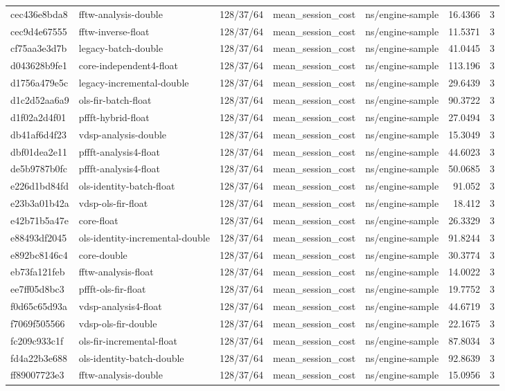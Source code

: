\begin{longtable}{lllllrr}
cec436e8bda8 & fftw-analysis-double & 128/37/64 & mean\_session\_cost & ns/engine-sample & 16.4366 & 3 \\
cec9d4e67555 & fftw-inverse-float & 128/37/64 & mean\_session\_cost & ns/engine-sample & 11.5371 & 3 \\
cf75aa3e3d7b & legacy-batch-double & 128/37/64 & mean\_session\_cost & ns/engine-sample & 41.0445 & 3 \\
d043628b9fe1 & core-independent4-float & 128/37/64 & mean\_session\_cost & ns/engine-sample & 113.196 & 3 \\
d1756a479e5c & legacy-incremental-double & 128/37/64 & mean\_session\_cost & ns/engine-sample & 29.6439 & 3 \\
d1c2d52aa6a9 & ols-fir-batch-float & 128/37/64 & mean\_session\_cost & ns/engine-sample & 90.3722 & 3 \\
d1f02a2d4f01 & pffft-hybrid-float & 128/37/64 & mean\_session\_cost & ns/engine-sample & 27.0494 & 3 \\
db41af6d4f23 & vdsp-analysis-double & 128/37/64 & mean\_session\_cost & ns/engine-sample & 15.3049 & 3 \\
dbf01dea2e11 & pffft-analysis4-float & 128/37/64 & mean\_session\_cost & ns/engine-sample & 44.6023 & 3 \\
de5b9787b0fc & pffft-analysis4-float & 128/37/64 & mean\_session\_cost & ns/engine-sample & 50.0685 & 3 \\
e226d1bd84fd & ols-identity-batch-float & 128/37/64 & mean\_session\_cost & ns/engine-sample & 91.052 & 3 \\
e23b3a01b42a & vdsp-ols-fir-float & 128/37/64 & mean\_session\_cost & ns/engine-sample & 18.412 & 3 \\
e42b71b5a47e & core-float & 128/37/64 & mean\_session\_cost & ns/engine-sample & 26.3329 & 3 \\
e88493df2045 & ols-identity-incremental-double & 128/37/64 & mean\_session\_cost & ns/engine-sample & 91.8244 & 3 \\
e892bc8146c4 & core-double & 128/37/64 & mean\_session\_cost & ns/engine-sample & 30.3774 & 3 \\
eb73fa121feb & fftw-analysis-float & 128/37/64 & mean\_session\_cost & ns/engine-sample & 14.0022 & 3 \\
ee7ff05d8bc3 & pffft-ols-fir-float & 128/37/64 & mean\_session\_cost & ns/engine-sample & 19.7752 & 3 \\
f0d65c65d93a & vdsp-analysis4-float & 128/37/64 & mean\_session\_cost & ns/engine-sample & 44.6719 & 3 \\
f7069f505566 & vdsp-ols-fir-double & 128/37/64 & mean\_session\_cost & ns/engine-sample & 22.1675 & 3 \\
fc209c933c1f & ols-fir-incremental-float & 128/37/64 & mean\_session\_cost & ns/engine-sample & 87.8034 & 3 \\
fd4a22b3e688 & ols-identity-batch-double & 128/37/64 & mean\_session\_cost & ns/engine-sample & 92.8639 & 3 \\
ff89007723e3 & fftw-analysis-double & 128/37/64 & mean\_session\_cost & ns/engine-sample & 15.0956 & 3 \\
\end{longtable}
\endgroup
